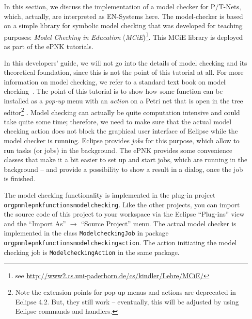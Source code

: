 In this section, we discuss the implementation of a model checker for P/T-Nets,
which, actually, are interpreted as EN-Systems here. The model-checker is based
on a simple library for symbolic model checking that was developed for
teaching purposes: \emph{Model Checking in Education} (\emph{MCiE})\footnote{
see \url{http://www2.cs.uni-paderborn.de/cs/kindler/Lehre/MCiE/}}. This MCiE
library is deployed as part of the ePNK tutorials.

In this developers' guide, we will not go into the details of model checking
and its theoretical foundation, since this is not the point of this tutorial
at all. For more information on model checking, we refer to a standard text book
on model checking~\cite{CGP99}. The point of this tutorial is to show how some
function can be installed as a \emph{pop-up} menu with an \emph{action} on a
Petri net that is open in the tree editor\footnote
  {Note the extension points for pop-up menus and actions are deprecated
   in Eclipse 4.2. But, they still work -- eventually, this will be adjusted
   by using Eclipse commands and handlers.}%
. Model checking can actually be quite computation intensive and
could take quite some time; therefore, we need to make sure that the actual
model checking action does not block the graphical user interface of Eclipse
while the model checker is running. Eclipse provides \emph{jobs} for this
purpose, which allow to run tasks (or jobs) in the background.
The ePNK provides some convenience classes that make it a bit easier to set up
and start jobs, which are running in the background -- and provide a possibility
to show a result in a dialog, once the job is finished.

The model checking functionality is implemented in the plug-in project
{\tt org\qnsep{}pnml\qnsep{}epnk\qnsep{}functions\qnsep{}modelchecking}. Like the other projects,
you can import the source code of this project to your workspace via
the Eclipse ``Plug-ins'' view and the ``Import As'' $\rightarrow$ ``Source
Project'' menu. The actual model checker is implemented in
the class {\tt ModelcheckingJob} in package
{\tt org\qnsep{}pnml\qnsep{}epnk\qnsep{}functions\qnsep{}modelchecking\qnsep{}action}.
The action initiating the model checking job is
{\tt Modelchecking\optsep{}Action} in the same package.

